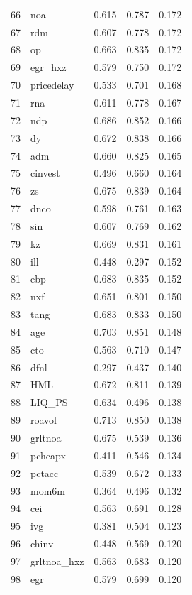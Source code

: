 \begin{footnotesize}
\begin{longtable}{rl|c|c|c}
		66 & noa & 0.615 & 0.787 & 0.172 \\ 
		67 & rdm & 0.607 & 0.778 & 0.172 \\ 
		68 & op & 0.663 & 0.835 & 0.172 \\ 
		69 & egr\_hxz & 0.579 & 0.750 & 0.172 \\ 
		70 & pricedelay & 0.533 & 0.701 & 0.168 \\ 
		71 & rna & 0.611 & 0.778 & 0.167 \\ 
		72 & ndp & 0.686 & 0.852 & 0.166 \\ 
		73 & dy & 0.672 & 0.838 & 0.166 \\ 
		74 & adm & 0.660 & 0.825 & 0.165 \\ 
		75 & cinvest & 0.496 & 0.660 & 0.164 \\ 
		76 & zs & 0.675 & 0.839 & 0.164 \\ 
		77 & dnco & 0.598 & 0.761 & 0.163 \\ 
		78 & sin & 0.607 & 0.769 & 0.162 \\ 
		79 & kz & 0.669 & 0.831 & 0.161 \\ 
		80 & ill & 0.448 & 0.297 & 0.152 \\ 
		81 & ebp & 0.683 & 0.835 & 0.152 \\ 
		82 & nxf & 0.651 & 0.801 & 0.150 \\ 
		83 & tang & 0.683 & 0.833 & 0.150 \\ 
		84 & age & 0.703 & 0.851 & 0.148 \\ 
		85 & cto & 0.563 & 0.710 & 0.147 \\ 
		86 & dfnl & 0.297 & 0.437 & 0.140 \\ 
		87 & HML & 0.672 & 0.811 & 0.139 \\ 
		88 & LIQ\_PS & 0.634 & 0.496 & 0.138 \\ 
		89 & roavol & 0.713 & 0.850 & 0.138 \\ 
		90 & grltnoa & 0.675 & 0.539 & 0.136 \\ 
		91 & pchcapx & 0.411 & 0.546 & 0.134 \\ 
		92 & pctacc & 0.539 & 0.672 & 0.133 \\ 
		93 & mom6m & 0.364 & 0.496 & 0.132 \\ 
		94 & cei & 0.563 & 0.691 & 0.128 \\ 
		95 & ivg & 0.381 & 0.504 & 0.123 \\ 
		96 & chinv & 0.448 & 0.569 & 0.120 \\ 
		97 & grltnoa\_hxz & 0.563 & 0.683 & 0.120 \\ 
		98 & egr & 0.579 & 0.699 & 0.120 \\ 

\end{longtable}
\end{footnotesize}
